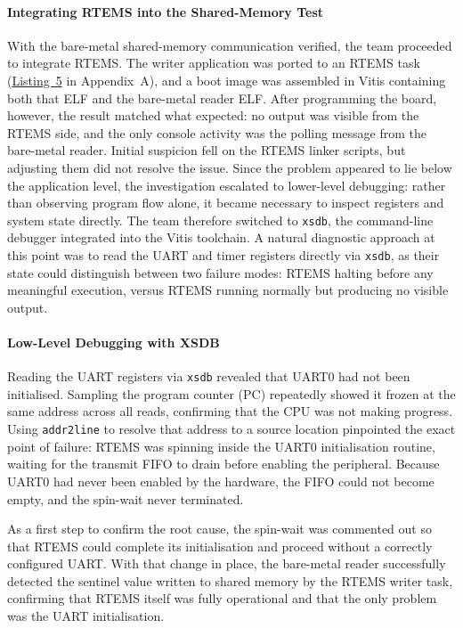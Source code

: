 \documentclass[
	a4paper,
]{CSMakotoTechnicalReport}
\begin{document}
\paragraph*{Integrating RTEMS into the Shared-Memory Test}

With the bare-metal shared-memory communication verified, the team proceeded to integrate RTEMS.
The writer application was ported to an RTEMS task (\hyperref[lst:5]{Listing~5} in Appendix~A), and a boot image was assembled in Vitis containing both that ELF and the bare-metal reader ELF.
After programming the board, however, the result matched what expected: no output was visible from the RTEMS side, and the only console activity was the polling message from the bare-metal reader.
Initial suspicion fell on the RTEMS linker scripts, but adjusting them did not resolve the issue.
Since the problem appeared to lie below the application level, the investigation escalated to lower-level debugging: rather than observing program flow alone, it became necessary to inspect registers and system state directly.
The team therefore switched to \texttt{xsdb}, the command-line debugger integrated into the Vitis toolchain.
A natural diagnostic approach at this point was to read the UART and timer registers directly via \texttt{xsdb}, as their state could distinguish between two failure modes: RTEMS halting before any meaningful execution, versus RTEMS running normally but producing no visible output.

\paragraph*{Low-Level Debugging with XSDB}

Reading the UART registers via \texttt{xsdb} revealed that UART0 had not been initialised.
Sampling the program counter (PC) repeatedly showed it frozen at the same address across all reads, confirming that the CPU was not making progress.
Using \texttt{addr2line} to resolve that address to a source location pinpointed the exact point of failure: RTEMS was spinning inside the UART0 initialisation routine, waiting for the transmit FIFO to drain before enabling the peripheral.
Because UART0 had never been enabled by the hardware, the FIFO could not become empty, and the spin-wait never terminated.

As a first step to confirm the root cause, the spin-wait was commented out so that RTEMS could complete its initialisation and proceed without a correctly configured UART.
With that change in place, the bare-metal reader successfully detected the sentinel value written to shared memory by the RTEMS writer task, confirming that RTEMS itself was fully operational and that the only problem was the UART initialisation.
\end{document}
